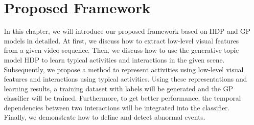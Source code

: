 \chapter{Proposed Framework}
\label{chap:framework}
In this chapter, we will introduce our proposed framework based on HDP and GP models in detailed. At first, we discuss how to extract low-level visual features from a given video sequence. Then, we discuss how to use the generative topic model HDP to learn typical activities and interactions in the given scene. Subsequently, we propose a method to represent activities using low-level visual features and interactions using typical activities. Using these representations and learning results, a training dataset with labels will be generated and the GP classifier will be trained. Furthermore, to get better performance, the temporal dependencies between two interactions will be integrated into the classifier. Finally, we demonstrate how to define and detect abnormal events.
